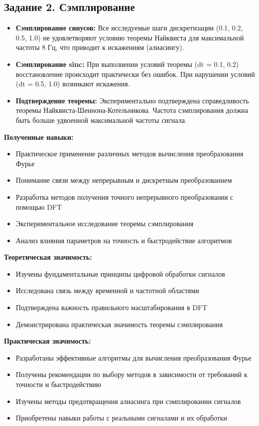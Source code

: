 \subsection*{Задание 2. Сэмплирование}
\begin{itemize}
    \item \textbf{Сэмплирование синусов:} Все исследуемые шаги дискретизации (0.1, 0.2, 0.5, 1.0) не удовлетворяют условию теоремы Найквиста для максимальной частоты 8 Гц, что приводит к искажениям (алиасингу).
    
    \item \textbf{Сэмплирование sinc:} При выполнении условий теоремы (dt = 0.1, 0.2) восстановление происходит практически без ошибок. При нарушении условий (dt = 0.5, 1.0) возникают искажения.
    
    \item \textbf{Подтверждение теоремы:} Экспериментально подтверждена справедливость теоремы Найквиста-Шеннона-Котельникова. Частота сэмплирования должна быть больше удвоенной максимальной частоты сигнала.
\end{itemize}

\textbf{Полученные навыки:}
\begin{itemize}
    \item Практическое применение различных методов вычисления преобразования Фурье
    \item Понимание связи между непрерывным и дискретным преобразованием
    \item Разработка методов получения точного непрерывного преобразования с помощью DFT
    \item Экспериментальное исследование теоремы сэмплирования
    \item Анализ влияния параметров на точность и быстродействие алгоритмов
\end{itemize}

\textbf{Теоретическая значимость:}
\begin{itemize}
    \item Изучены фундаментальные принципы цифровой обработки сигналов
    \item Исследована связь между временной и частотной областями
    \item Подтверждена важность правильного масштабирования в DFT
    \item Демонстрирована практическая значимость теоремы сэмплирования
\end{itemize}

\textbf{Практическая значимость:}
\begin{itemize}
    \item Разработаны эффективные алгоритмы для вычисления преобразования Фурье
    \item Получены рекомендации по выбору методов в зависимости от требований к точности и быстродействию
    \item Изучены методы предотвращения алиасинга при сэмплировании сигналов
    \item Приобретены навыки работы с реальными сигналами и их обработки
\end{itemize}
